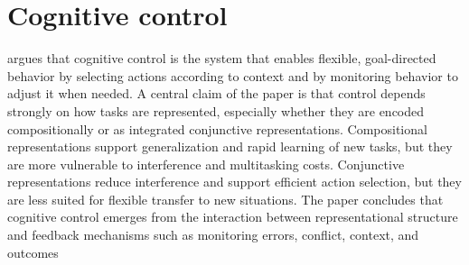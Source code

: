 \documentclass[a4paper]{article}
\title{}
\date{}
\begin{document}
    \maketitle
    
    
    \section{Cognitive control}
        \cite{badre-2025-cognitive-control} argues that cognitive control is the system that enables flexible, goal-directed behavior by selecting actions according to context and by monitoring behavior to adjust it when needed. A central claim of the paper is that control depends strongly on how tasks are represented, especially whether they are encoded compositionally or as integrated conjunctive representations. Compositional representations support generalization and rapid learning of new tasks, but they are more vulnerable to interference and multitasking costs. Conjunctive representations reduce interference and support efficient action selection, but they are less suited for flexible transfer to new situations. The paper concludes that cognitive control emerges from the interaction between representational structure and feedback mechanisms such as monitoring errors, conflict, context, and outcomes
        
        
        
\end{document}
